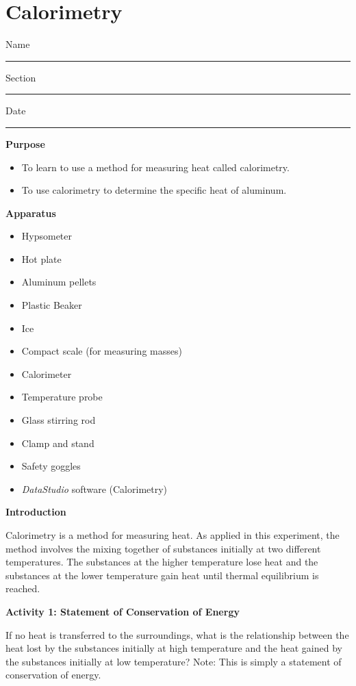 \setcounter{equation}{0}
\setcounter{figure}{0}

\section{Calorimetry}

Name \rule{2.0in}{0.1pt}\hfill{}Section \rule{1.0in}{0.1pt}\hfill{}Date
\rule{1.0in}{0.1pt}

\textbf{Purpose}

\begin{itemize}

\item To learn to use a method for measuring heat called calorimetry.

\item To use calorimetry to determine the specific heat of aluminum.

\end{itemize}

\textbf{Apparatus}

\begin{itemize}
\item Hypsometer
\item Hot plate 
\item Aluminum pellets
\item Plastic Beaker
\item Ice 
\item Compact scale (for measuring masses)
\item Calorimeter
\item Temperature probe
\item Glass stirring rod
\item Clamp and stand
\item Safety goggles
\item \textit{DataStudio} software (Calorimetry)
\end{itemize}
\textbf{Introduction} 

Calorimetry is a method for measuring heat. As applied in this experiment,
the method involves the mixing together of substances initially at
two different temperatures. The substances at the higher temperature
lose heat and the substances at the lower temperature gain heat until
thermal equilibrium is reached.

\textbf{Activity 1: Statement of Conservation of Energy}

If no heat is transferred to the surroundings, what is the relationship
between the heat lost by the substances initially at high temperature
and the heat gained by the substances initially at low temperature?
Note: This is simply a statement of conservation of energy.


